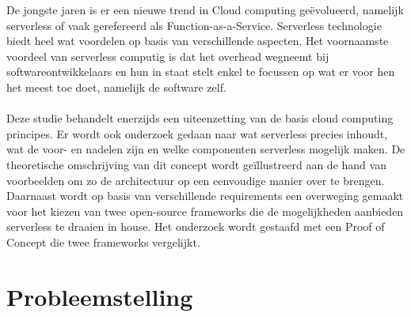De jongste jaren is er een nieuwe trend in Cloud computing geëvolueerd, namelijk serverless of vaak gerefereerd als Function-as-a-Service. Serverless technologie biedt heel wat voordelen op basis van verschillende aspecten. Het voornaamste voordeel van serverless computig is dat het overhead wegneemt bij softwareontwikkelaars en hun in staat stelt enkel te focussen op wat er voor hen het meest toe doet, namelijk de software zelf.
\\\\

Deze studie behandelt enerzijds een uiteenzetting van de basis cloud computing principes. Er wordt ook onderzoek gedaan naar wat serverless precies inhoudt, wat de voor- en nadelen zijn en welke componenten serverless mogelijk maken. De theoretische omschrijving van dit concept wordt geïllustreerd aan de hand van voorbeelden om zo de architectuur op een eenvoudige manier over te brengen. Daarnaast wordt op basis van verschillende requirements een overweging gemaakt voor het kiezen van twee open-source frameworks die de mogelijkheden aanbieden serverless te draaien in house. Het onderzoek wordt gestaafd met een Proof of Concept die twee frameworks vergelijkt.


\section{Probleemstelling}
\label{sec:probleemstelling}



